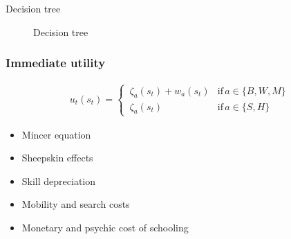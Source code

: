 \begin{frame}{Decision tree}
\begin{figure}
  \scalebox{0.55}{}
  \caption{Decision tree}
\end{figure}
\end{frame}
\begin{frame}\frametitle{Immediate utility}\vspace{0.3cm}

  \begin{multicols}{2}

  \begin{align*}
  u_t(s_t) =
  \begin{cases}
      \,\zeta_a(s_t)  + w_a(s_t)   & \text{if}\, a \in \{B, W, M\}  \\[0.2cm]
      \,\zeta_a(s_t)                 &  \text{if}\, a \in \{S, H\}
  \end{cases}
  \end{align*}

  \columnbreak


  \vspace{0.3cm}
  \begin{itemize}\setlength\itemsep{1em}
     \item Mincer equation
     \item Sheepskin effects
     \item Skill depreciation
     \item Mobility and search costs
     \item Monetary and psychic cost of schooling
  \end{itemize}

\end{multicols}

\end{frame}
